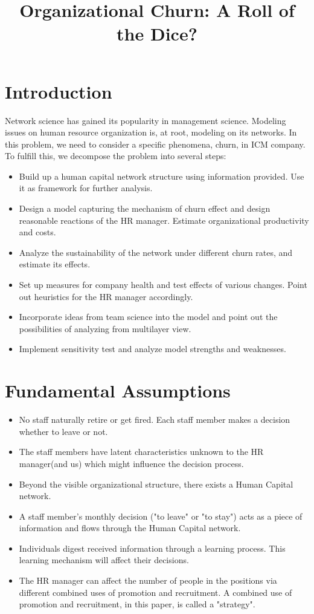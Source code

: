 \documentclass[tcn = 37075, sheet = false, abstract = false]{mcmthesis}
\title{Organizational Churn: A Roll of the Dice?}
\author{}
\date{}
\begin{document}
\maketitle


\setcounter{tocdepth}{2}
\tableofcontents

\section{Introduction}

Network science has gained its popularity in management science. Modeling issues on human resource organization is, at root, modeling on its networks. In this problem, we need to consider a specific phenomena, churn, in  ICM company. To fulfill this, we decompose the problem into several steps:

\begin{itemize}
\item Build up a human capital network structure using information provided. Use it as framework for further analysis.
\item Design a model capturing the mechanism of churn effect and design reasonable reactions of the HR manager. Estimate organizational productivity and costs.
\item Analyze the sustainability of the network under different churn rates, and estimate its effects.
\item Set up measures for company health and test effects of various changes. Point out heuristics for the HR manager accordingly.
\item Incorporate ideas from team science into the model and point out the possibilities of analyzing from multilayer view.
\item Implement sensitivity test and analyze model strengths and weaknesses.
\end{itemize}

\section{Fundamental Assumptions}

\begin{itemize}
\item No staff naturally retire or get fired. Each staff member makes a decision whether to leave or not.
\item The staff members have latent characteristics unknown to the HR manager(and us) which might influence the decision process.
\item Beyond the visible organizational structure, there exists a Human Capital network.
\item A staff member's monthly decision ("to leave" or "to stay") acts as a piece of information and flows through the Human Capital network.
\item Individuals digest received information through a learning process. This learning mechanism will affect their decisions.
\item The HR manager can affect the number of people in the positions via different combined uses of promotion and recruitment. A combined use of promotion and recruitment, in this paper, is called a "strategy".
\end{itemize}
\end{document}
